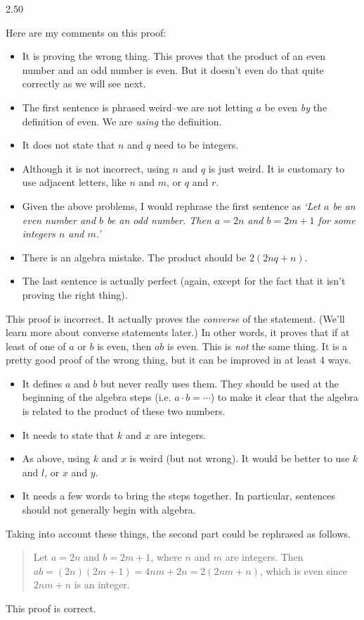 \begin{Answer}{2.50}
\begin{pfevalenum}
\item
Here are my comments on this proof:
\begin{itemize}
\item
It is proving the wrong thing.  This proves that the product of an even number and
an odd number is even.  But it doesn't even do that quite correctly as we will see next.
\item
The first sentence is phrased weird--we are not letting $a$ be even {\em by} the definition of even.
We are {\em using} the definition.
\item
It does not state that $n$ and $q$ need to be integers.
\item
Although it is not incorrect, using $n$ and $q$ is just weird.
It is customary to use adjacent letters, like $n$ and $m$, or $q$ and $r$.
\item
Given the above problems, I would rephrase the first sentence as
{\em `Let $a$ be an even number and $b$ be an odd number.
Then $a=2n$ and $b=2m+1$ for some integers $n$ and $m$.'}
\item
There is an algebra mistake.  The product should be $2(2nq+n)$.
\item
The last sentence is actually perfect (again, except for the fact that it isn't proving the right thing).
\end{itemize}
\item
This proof is incorrect.  It actually proves the {\em converse} of the statement.  (We'll learn more about
converse statements later.)
In other words, it proves that if at least of one of $a$ or $b$ is even, then $ab$ is even.
This is {\em not} the same thing.
It is a pretty good proof
of the wrong thing, but it can be improved in at least 4 ways.
\begin{itemize}
\item
It defines $a$ and $b$ but never really uses them.
They should be used at the beginning of the algebra steps (i.e. $a\cdot b=\cdots$) to make
it clear that the algebra is related to the product of these two numbers.
\item
It needs to state that $k$ and $x$ are integers.
\item
As above, using $k$ and $x$ is weird (but not wrong).  It would be better to use $k$ and $l$, or $x$ and $y$.
\item
It needs a few words to bring the steps together.
In particular, sentences should not generally begin with algebra.
\end{itemize}
Taking into account these things, the second part could be rephrased as follows.
\begin{quote}
Let $a=2n$ and $b=2m+1$, where $n$ and $m$ are integers.
Then $ab=(2n)(2m+1)=4nm+2n=2(2nm+n)$, which is even since $2nm+n$ is an integer.
\end{quote}
\item
This proof is correct.
\end{pfevalenum}
\end{Answer}
